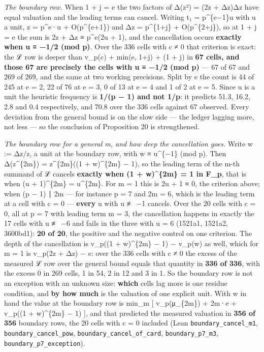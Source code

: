 \documentclass[11pt,a4paper]{article}
\theoremstyle{named}
\begin{document}
\textit{The boundary row.} When 1 + j = e the two factors of Δ(z²) = (2z + Δz)Δz have equal valuation and the leading terms can cancel. Writing t₁ = p\textasciicircum{}\{e−1\}u with u a unit, z = p\textasciicircum{}e·u + O(p\textasciicircum{}\{e+1\}) and Δz = p\textasciicircum{}\{1+j\} + O(p\textasciicircum{}\{2+j\}), so at 1 + j = e the sum is 2z + Δz ≡ p\textasciicircum{}e(2u + 1), and the cancellation occurs \textbf{exactly when u ≡ −1/2 (mod p)}. Over the 336 cells with c ≠ 0 that criterion is exact: the ℒ row is deeper than v\_p(c) + min(e, 1+j) + (1 + j) in \textbf{67 cells, and those 67 are precisely the cells with u ≡ −1/2 (mod p)} — 67 of 67 and 269 of 269, and the same at two working precisions. Split by e the count is 44 of 245 at e = 2, 22 of 76 at e = 3, 0 of 13 at e = 4 and 1 of 2 at e = 5. Since u is a unit the heuristic frequency is \textbf{1/(p − 1) and not 1/p}: it predicts 51.3, 16.2, 2.8 and 0.4 respectively, and 70.8 over the 336 cells against 67 observed. Every deviation from the general bound is on the slow side — the ledger lagging more, not less — so the conclusion of Proposition 20 is strengthened.

\textit{The boundary row for a general m, and how deep the cancellation goes.} Write w := Δz/z, a unit at the boundary row, with w ≡ u\textasciicircum{}\{−1\} (mod p). Then Δ(z\textasciicircum{}\{2m\}) = z\textasciicircum{}\{2m\}((1 + w)\textasciicircum{}\{2m\} − 1), so the leading term of the m-th summand of ℒ cancels \textbf{exactly when (1 + w)\textasciicircum{}\{2m\} = 1 in F\_p}, that is when (u + 1)\textasciicircum{}\{2m\} = u\textasciicircum{}\{2m\}. For m = 1 this is 2u + 1 ≡ 0, the criterion above; when (p − 1) ∣ 2m — for instance p = 7 and 2m = 6, which is the leading term at a cell with c = 0 — \textbf{every} u with u ≢ −1 cancels. Over the 20 cells with c = 0, all at p = 7 with leading term m = 3, the cancellation happens in exactly the 17 cells with u ≢ −6 and fails in the three with u = 6 (1521a1, 1521a2, 3600bd1): \textbf{20 of 20}, the positive and the negative control on one criterion. The depth of the cancellation is v\_p((1 + w)\textasciicircum{}\{2m\} − 1) − v\_p(w) as well, which for m = 1 is v\_p(2z + Δz) − e: over the 336 cells with c ≠ 0 the excess of the measured ℒ row over the general bound equals that quantity in \textbf{336 of 336}, with the excess 0 in 269 cells, 1 in 54, 2 in 12 and 3 in 1. So the boundary row is not an exception with an unknown size: \textbf{which} cells lag more is one residue condition, and \textbf{by how much} is the valuation of one explicit unit. With w in hand the value at the boundary row is min\_m [ v\_p(μ\_\{2m\}) + 2m·e + v\_p((1 + w)\textasciicircum{}\{2m\} − 1) ], and that predicted the measured valuation in \textbf{356 of 356} boundary rows, the 20 cells with c = 0 included (Lean \texttt{boundary\_\allowbreak{}cancel\_\allowbreak{}m1}, \texttt{boundary\_\allowbreak{}cancel\_\allowbreak{}pow}, \texttt{boundary\_\allowbreak{}cancel\_\allowbreak{}of\_\allowbreak{}card}, \texttt{boundary\_\allowbreak{}p7\_\allowbreak{}m3}, \texttt{boundary\_\allowbreak{}p7\_\allowbreak{}exception}).
\end{document}
